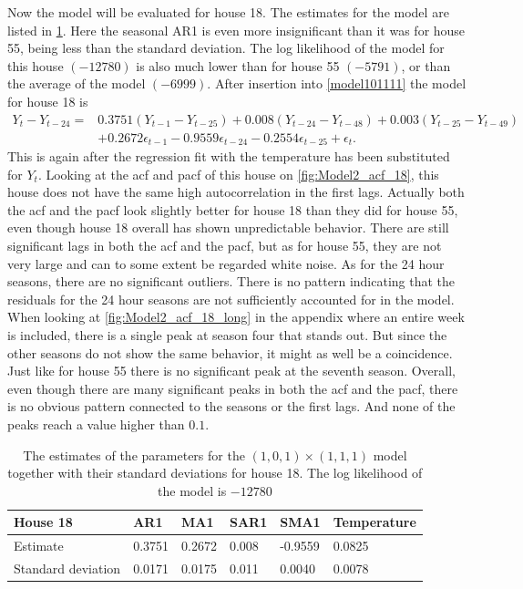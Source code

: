 \noindent Now the model will be evaluated for house 18. The estimates for the model are listed in \cref{tab:ParamSig_House18}. Here the seasonal AR1 is even more insignificant than it was for house 55, being less than the standard deviation. The log likelihood of the model for this house $(-12780)$ is also much lower than for house 55 $(-5791)$, or than the average of the model $(-6999)$. After insertion into \cref{model101111} the model for house 18 is
\begin{align}
    Y_t-Y_{t-24} = &0.3751 (Y_{t-1}-Y_{t-25}) + 0.008 (Y_{t-24}-Y_{t-48}) + 0.003 (Y_{t-25}-Y_{t-49}) \\  &+ 0.2672 \epsilon_{t-1} - 0.9559 \epsilon_{t-24} - 0.2554 \epsilon_{t-25} + \epsilon_t. \nonumber
\end{align}
This is again after the regression fit with the temperature has been substituted for $Y_t$. Looking at the acf and pacf of this house on \cref{fig:Model2_acf_18}, this house does not have the same high autocorrelation in the first lags. Actually both the acf and the pacf look slightly better for house 18 than they did for house 55, even though house 18 overall has shown unpredictable behavior. There are still significant lags in both the acf and the pacf, but as for house 55, they are not very large and can to some extent be regarded white noise. As for the 24 hour seasons, there are no significant outliers. There is no pattern indicating that the residuals for the 24 hour seasons are not sufficiently accounted for in the model. When looking at \cref{fig:Model2_acf_18_long} in the appendix where an entire week is included, there is a single peak at season four that stands out. But since the other seasons do not show the same behavior, it might as well be a coincidence. Just like for house 55 there is no significant peak at the seventh season. Overall, even though there are many significant peaks in both the acf and the pacf, there is no obvious pattern connected to the seasons or the first lags. And none of the peaks reach a value higher than $0.1$.

 \begin{table}[]
    \centering
    \begin{tabular}{|l|l|l|l|l|l|}
    \hline
    House 18           & AR1    & MA1    & SAR1  & SMA1    & Temperature \\ \hline
    Estimate           & 0.3751 & 0.2672 & 0.008 & -0.9559 & 0.0825      \\ \hline
    Standard deviation & 0.0171 & 0.0175 & 0.011 & 0.0040  & 0.0078      \\ \hline
    \end{tabular}
    \caption{The estimates of the parameters for the $(1,0,1)\times (1,1,1)$ model together with their standard deviations for house 18. The log likelihood of the model is $-12780$}
    \label{tab:ParamSig_House18}
    \end{table}


